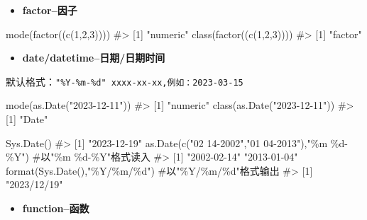 \documentclass[
  letterpaper,
  DIV=11,
  numbers=noendperiod]{scrreprt}
\newenvironment{Shaded}{\begin{snugshade}}{\end{snugshade}}
\newcommand{\CommentTok}[1]{\textcolor[rgb]{0.37,0.37,0.37}{#1}}
\newcommand{\DecValTok}[1]{\textcolor[rgb]{0.68,0.00,0.00}{#1}}
\newcommand{\FunctionTok}[1]{\textcolor[rgb]{0.28,0.35,0.67}{#1}}
\newcommand{\NormalTok}[1]{\textcolor[rgb]{0.00,0.23,0.31}{#1}}
\newcommand{\StringTok}[1]{\textcolor[rgb]{0.13,0.47,0.30}{#1}}
\providecommand{\tightlist}{%
  \setlength{\itemsep}{0pt}\setlength{\parskip}{0pt}}\usepackage{longtable,booktabs,array}
\begin{document}
\begin{itemize}
\tightlist
\item
  \textbf{factor--因子}
\end{itemize}

\begin{Shaded}
\begin{Highlighting}[]
\FunctionTok{mode}\NormalTok{(}\FunctionTok{factor}\NormalTok{((}\FunctionTok{c}\NormalTok{(}\DecValTok{1}\NormalTok{,}\DecValTok{2}\NormalTok{,}\DecValTok{3}\NormalTok{)))) }
\CommentTok{\#\textgreater{} [1] "numeric"}
\FunctionTok{class}\NormalTok{(}\FunctionTok{factor}\NormalTok{((}\FunctionTok{c}\NormalTok{(}\DecValTok{1}\NormalTok{,}\DecValTok{2}\NormalTok{,}\DecValTok{3}\NormalTok{)))) }
\CommentTok{\#\textgreater{} [1] "factor"}
\end{Highlighting}
\end{Shaded}

\begin{itemize}
\tightlist
\item
  \textbf{date/datetime--日期/日期时间}
\end{itemize}

默认格式：\texttt{"\%Y-\%m-\%d"\ xxxx-xx-xx,例如：2023-03-15}

\begin{Shaded}
\begin{Highlighting}[]
\FunctionTok{mode}\NormalTok{(}\FunctionTok{as.Date}\NormalTok{(}\StringTok{"2023{-}12{-}11"}\NormalTok{))}
\CommentTok{\#\textgreater{} [1] "numeric"}
\FunctionTok{class}\NormalTok{(}\FunctionTok{as.Date}\NormalTok{(}\StringTok{"2023{-}12{-}11"}\NormalTok{)) }
\CommentTok{\#\textgreater{} [1] "Date"}

\FunctionTok{Sys.Date}\NormalTok{()}
\CommentTok{\#\textgreater{} [1] "2023{-}12{-}19"}
\FunctionTok{as.Date}\NormalTok{(}\FunctionTok{c}\NormalTok{(}\StringTok{"02 14{-}2002"}\NormalTok{,}\StringTok{"01 04{-}2013"}\NormalTok{),}\StringTok{"\%m \%d{-}\%Y"}\NormalTok{) }\CommentTok{\#以"\%m \%d{-}\%Y"格式读入}
\CommentTok{\#\textgreater{} [1] "2002{-}02{-}14" "2013{-}01{-}04"}
\FunctionTok{format}\NormalTok{(}\FunctionTok{Sys.Date}\NormalTok{(),}\StringTok{"\%Y/\%m/\%d"}\NormalTok{) }\CommentTok{\#以"\%Y/\%m/\%d"格式输出}
\CommentTok{\#\textgreater{} [1] "2023/12/19"}
\end{Highlighting}
\end{Shaded}

\begin{itemize}
\tightlist
\item
  \textbf{function--函数}
\end{itemize}
\end{document}
